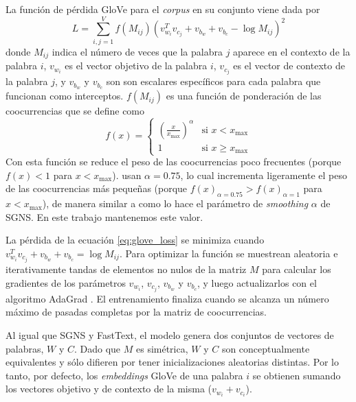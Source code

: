 La función de pérdida GloVe para el \emph{corpus} en su conjunto viene dada por 
%
\begin{equation} \label{eq:glove_loss}
    L = \sum_{i,j=1}^V f(M_{ij}) (v_{w_i}^T v_{c_j} + v_{b_w} + v_{b_c} - \log M_{ij})^2
\end{equation}
%
donde $M_{ij}$ indica el número de veces que la palabra $j$ aparece en el contexto de la palabra $i$, $v_{w_i}$ es el vector objetivo de la palabra $i$, $v_{c_j}$ es el vector de contexto de la palabra $j$, y $v_{b_w}$ y $v_{b_c}$ son son escalares específicos para cada palabra que funcionan como interceptos. $f(M_{ij})$ es una función de ponderación de las coocurrencias que se define como
%
\begin{equation}
    f(x) = \begin{cases}
        \left(\frac{x}{x_{\text{max}}}\right)^\alpha & \text{si } x < x_{\text{max}} \\
        1 & \text{si } x \geq x_{\text{max}}
    \end{cases}
\end{equation}
%
Con esta función se reduce el peso de las coocurrencias poco frecuentes (porque $f(x) < 1$ para $x < x_{\text{max}}$). \citet{pennington2014glove} usan $\alpha = 0.75$, lo cual incrementa ligeramente el peso de las coocurrencias más pequeñas (porque $f(x)_{\alpha=0.75} > f(x)_{\alpha=1}$ para $x < x_{\text{max}}$), de manera similar a como lo hace el parámetro de \emph{smoothing} $\alpha$ de SGNS. En este trabajo mantenemos este valor.

La pérdida de la ecuación \ref{eq:glove_loss} se minimiza cuando $v_{w_i}^T v_{c_j} + v_{b_w} + v_{b_c} = \log M_{ij}$. Para optimizar la función se muestrean aleatoria e iterativamente tandas de elementos no nulos de la matriz $M$ para calcular los gradientes de los parámetros $v_{w_i}$, $v_{c_j}$, $v_{b_w}$ y $v_{b_c}$, y luego actualizarlos con el algoritmo AdaGrad \citep{duchi2011adaptive}. El entrenamiento finaliza cuando se alcanza un número máximo de pasadas completas por la matriz de coocurrencias.

Al igual que SGNS y FastText, el modelo genera dos conjuntos de vectores de palabras, $W$ y $C$. Dado que $M$ es simétrica, $W$ y $C$ son conceptualmente equivalentes y sólo difieren por tener inicializaciones aleatorias distintas. Por lo tanto, por defecto, los \emph{embeddings} GloVe de una palabra $i$ se obtienen sumando los vectores objetivo y de contexto de la misma ($v_{w_i} + v_{c_i}$). 



